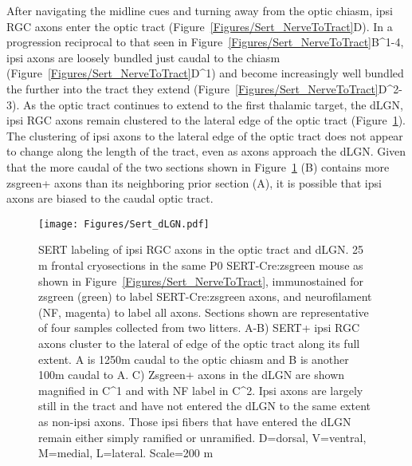 After navigating the midline cues and turning away from the optic chiasm, ipsi RGC axons enter the optic tract (Figure~\ref{Figures/Sert_NerveToTract}D).
In a progression reciprocal to that seen in Figure~\ref{Figures/Sert_NerveToTract}B^{1-4}, ipsi axons are loosely bundled just caudal to the chiasm (Figure~\ref{Figures/Sert_NerveToTract}D^1) and become increasingly well bundled the further into the tract they extend (Figure~\ref{Figures/Sert_NerveToTract}D^{2-3}).
As the optic tract continues to extend to the first thalamic target, the dLGN, ipsi RGC axons remain clustered to the lateral edge of the optic tract (Figure~\ref{Figures/Sert_dLGN}).
The clustering of ipsi axons to the lateral edge of the optic tract does not appear to change along the length of the tract, even as axons approach the dLGN.
Given that the more caudal of the two sections shown in Figure~\ref{Figures/Sert_dLGN} (B) contains more zsgreen+ axons than its neighboring prior section (A), it is possible that ipsi axons are biased to the caudal optic tract.

\begin{figure}[hbtp]
	\begin{center}
		\texttt{[image: Figures/Sert\_dLGN.pdf]}
		\caption[SERT labeling of ipsi RGC axons in the optic tract and dLGN.]
		{SERT labeling of ipsi RGC axons in the optic tract and dLGN.
		25 \mu m frontal cryosections in the same P0 SERT-Cre:zsgreen mouse as shown in Figure~\ref{Figures/Sert_NerveToTract}, immunostained for zsgreen (green) to label SERT-Cre:zsgreen axons, and neurofilament (NF, magenta) to label all axons.
		Sections shown are representative of four samples collected from two litters. %
		A-B) SERT+ ipsi RGC axons cluster to the lateral of edge of the optic tract along its full extent. 
		A is 1250\mu m caudal to the optic chiasm and B is another 100\mu m caudal to A.
		C) Zsgreen+ axons in the dLGN are shown magnified in C^1 and with NF label in C^2.
		Ipsi axons are largely still in the tract and have not entered the dLGN to the same extent as non-ipsi axons.
		Those ipsi fibers that have entered the dLGN remain either simply ramified or unramified.
		D=dorsal, V=ventral, M=medial, L=lateral. Scale=200 \mu m}
		\label{Figures/Sert_dLGN}
	\end{center}
\end{figure}
